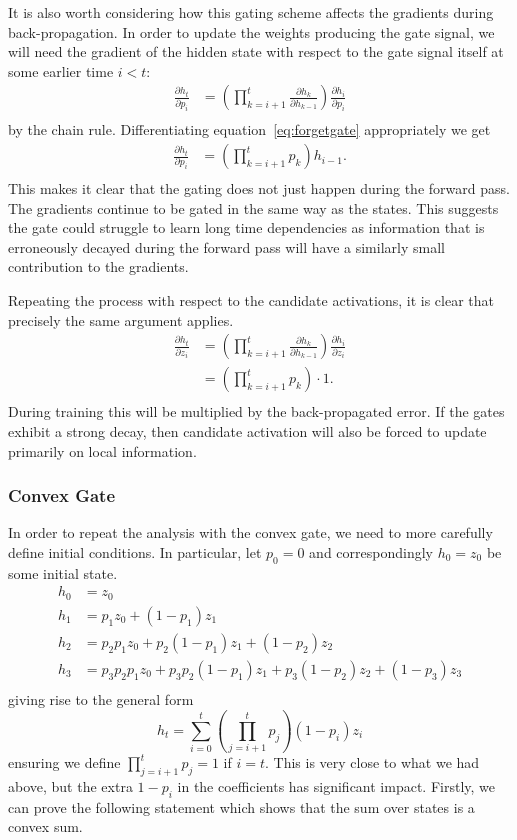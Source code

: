 It is also worth considering how this gating scheme affects the gradients during back-propagation.
In order to update the weights producing the gate signal, we will need the gradient of the hidden
state with respect to the gate signal itself at some earlier time \(i < t\):
\begin{align}
	\frac{\partial h_t}{\partial p_i} &= 
		\left(\prod_{k=i+1}^t \frac{\partial h_k}{\partial h_{k-1}}\right) 
			\frac{\partial h_i}{\partial p_i} \\
\end{align} by the chain rule. Differentiating equation~\ref{eq:forgetgate} appropriately we
get
\begin{align}
	\frac{\partial h_t}{\partial p_i} &= 
		\left(\prod_{k=i+1}^t p_k\right)
			h_{i-1}. \\
\end{align}
This makes it clear that the gating does not just happen during the forward pass. The gradients
continue to be gated in the same way as the states. This suggests the gate could struggle to
learn long time dependencies as information that is erroneously decayed during the forward pass
will have a similarly small contribution to the gradients.

Repeating the process with respect to the candidate activations, it is clear that precisely
the same argument applies.
\begin{align}
	\frac{\partial h_t}{\partial z_i} &= 
	\left(\prod_{k=i+1}^t \frac{\partial h_k}{\partial h_{k-1}}\right) 
			\frac{\partial h_i}{\partial z_i} \\
	&= \left(\prod_{k=i+1}^t p_k\right) \cdot
			1. \\
\end{align} During training this will be multiplied by the back-propagated error. If the gates
exhibit a strong decay, then candidate activation will also be forced to update primarily on
local information.

\subsubsection{Convex Gate}
In order to repeat the analysis with the convex gate, we need to more carefully define initial
conditions. In particular, let \(p_0 = 0\) and correspondingly \(h_0 = z_0\) be some initial
state.
\begin{align}
	h_0 &= z_0 \\
    h_1 &= p_1z_0 + (1-p_1)z_1 \\
    h_2 &= p_2p_1z_0 + p_2(1-p_1)z_1 + (1-p_2)z_2 \\
    h_3 &= p_3p_2p_1z_0 + p_3p_2(1-p_1)z_1 + p_3(1-p_2)z_2 + (1-p_3)z_3 \\
\end{align} giving rise to the general form
\begin{equation}
	h_t = \sum_{i=0}^t \left(\prod_{j=i+1}^t p_j\right) (1 - p_i) z_i
\end{equation} ensuring we define \(\prod_{j=i+1}^tp_j = 1\) if \(i = t\).
This is very close to what we had above, but the extra \(1-p_i\) in the
coefficients has significant impact. Firstly, we can prove the following statement which shows
that the sum over states is a convex sum.

